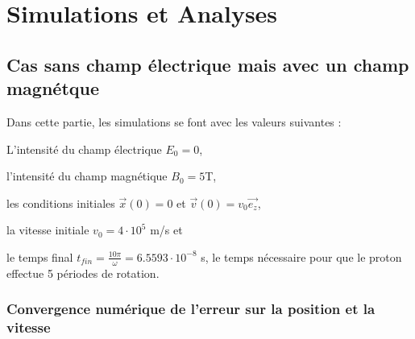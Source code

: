 \documentclass[a4paper,12pt,twoside]{article}
\begin{document}
\section{Simulations et Analyses}

	\subsection{Cas sans champ \'electrique mais avec un champ magn\'etque}
		\noindent Dans cette partie, les simulations se font avec les valeurs suivantes \cite{Notes} :
		
		\noindent L'intensit\'e du champ \'electrique $E_0=0$,
		
		\noindent l'intensit\'e du champ magn\'etique $B_0=5$T,
		
		\noindent les conditions initiales  $\vec{x}(0) = 0$ et $ \vec{v}(0) = v_0\vec{e_z}$,
		
		\noindent la vitesse initiale $v_0 = 4 \cdot 10^5$ m/s et 
	
		\noindent le temps final $t_{fin} = \frac{10 \pi}{\omega} = 6.5593 \cdot 10^{-8}$ s, le temps n\'ecessaire pour que le proton effectue 5 p\'eriodes de rotation. 
		
		
		\subsubsection{Convergence num\'erique de l'erreur sur la position et la vitesse}
		
\end{document}
